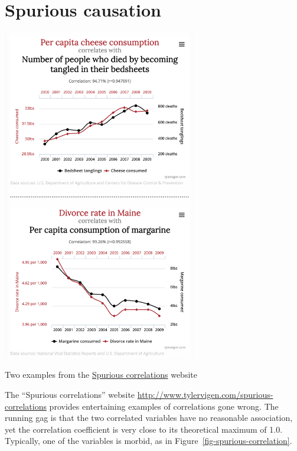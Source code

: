 \documentclass[
  letterpaper,
  DIV=11,
  numbers=noendperiod,
  oneside]{scrreprt}
\begin{document}
\hypertarget{spurious-causation}{%
\section{Spurious causation}\label{spurious-causation}}

\begin{marginfigure}

{\centering \includegraphics[width=3.32in,height=\textheight]{./www/spurious-correlations.png}

}

\caption{\label{fig-spurious-correlation}Two examples from the
\href{http://www.tylervigen.com/spurious-correlations}{Spurious
correlations} website}

\end{marginfigure}

The ``Spurious correlations'' website
\url{http://www.tylervigen.com/spurious-correlations} provides
entertaining examples of correlations gone wrong. The running gag is
that the two correlated variables have no reasonable association, yet
the correlation coefficient is very close to its theoretical maximum of
1.0. Typically, one of the variables is morbid, as in
Figure~\ref{fig-spurious-correlation}.
\end{document}
